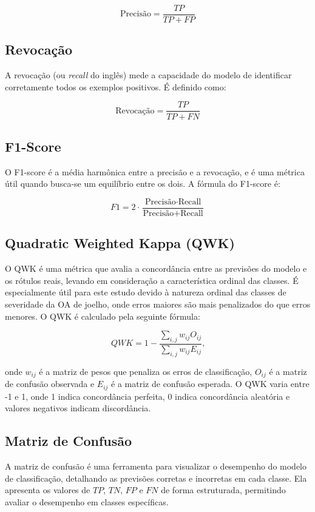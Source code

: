 \begin{equation}
    \text{Precisão} = \frac{TP}{TP + FP}
\end{equation}

\subsection{Revocação}
A revocação (ou \textit{recall} do inglês) mede a capacidade do modelo de identificar corretamente todos os exemplos positivos. É definido como:

\begin{equation}
    \text{Revocação} = \frac{TP}{TP + FN}
\end{equation}

\subsection{F1-Score}
O F1-score é a média harmônica entre a precisão e a revocação, e é uma métrica útil quando busca-se um equilíbrio entre os dois. A fórmula do F1-score é:

\begin{equation}
    F1 = 2 \cdot \frac{\text{Precisão} \cdot \text{Recall}}{\text{Precisão} + \text{Recall}}
\end{equation}

\subsection{Quadratic Weighted Kappa (QWK)}
O QWK é uma métrica que avalia a concordância entre as previsões do modelo e os rótulos reais, levando em consideração a característica ordinal das classes. É especialmente útil para este estudo devido à natureza ordinal das classes de severidade da OA de joelho, onde erros maiores são mais penalizados do que erros menores. O QWK é calculado pela seguinte fórmula:

\begin{equation}
    QWK = 1 - \frac{\sum_{i,j} w_{ij} O_{ij}}{\sum_{i,j} w_{ij} E_{ij}} \text{,}
\end{equation}

onde $w_{ij}$ é a matriz de pesos que penaliza os erros de classificação, $O_{ij}$ é a matriz de confusão observada e $E_{ij}$ é a matriz de confusão esperada. O QWK varia entre -1 e 1, onde 1 indica concordância perfeita, 0 indica concordância aleatória e valores negativos indicam discordância.

\subsection{Matriz de Confusão}
A matriz de confusão é uma ferramenta para visualizar o desempenho do modelo de classificação, detalhando as previsões corretas e incorretas em cada classe. Ela apresenta os valores de $TP$, $TN$, $FP$ e $FN$ de forma estruturada, permitindo avaliar o desempenho em classes específicas.

